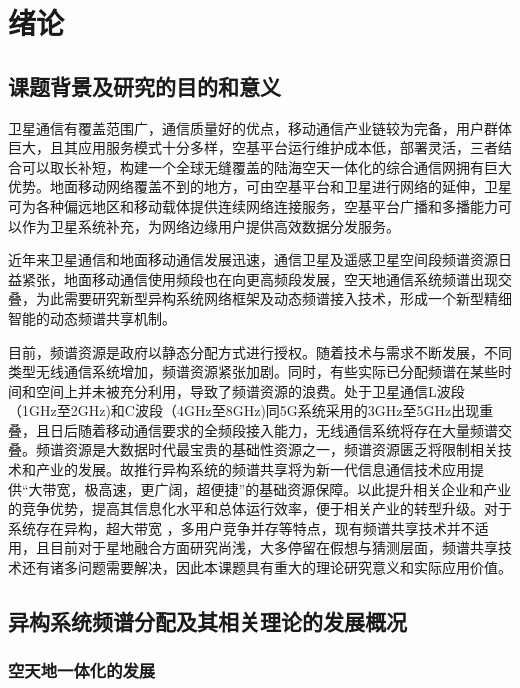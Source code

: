 \chapter{绪论}
\section{课题背景及研究的目的和意义}
卫星通信有覆盖范围广，通信质量好的优点，移动通信产业链较为完备，用户群体巨大，且其应用服务模式十分多样，空基平台运行维护成本低，部署灵活，三者结合可以取长补短，构建一个全球无缝覆盖的陆海空天一体化的综合通信网拥有巨大优势。地面移动网络覆盖不到的地方，可由空基平台和卫星进行网络的延伸，卫星可为各种偏远地区和移动载体提供连续网络连接服务，空基平台广播和多播能力可以作为卫星系统补充，为网络边缘用户提供高效数据分发服务。

近年来卫星通信和地面移动通信发展迅速，通信卫星及遥感卫星空间段频谱资源日益紧张，地面移动通信使用频段也在向更高频段发展，空天地通信系统频谱出现交叠，为此需要研究新型异构系统网络框架及动态频谱接入技术，形成一个新型精细智能的动态频谱共享机制。

目前，频谱资源是政府以静态分配方式进行授权。随着技术与需求不断发展，不同类型无线通信系统增加，频谱资源紧张加剧。同时，有些实际已分配频谱在某些时间和空间上并未被充分利用，导致了频谱资源的浪费。处于卫星通信L波段（1GHz至2GHz)和C波段（4GHz至8GHz)同5G系统采用的3GHz至5GHz出现重叠，且日后随着移动通信要求的全频段接入能力，无线通信系统将存在大量频谱交叠。频谱资源是大数据时代最宝贵的基础性资源之一，频谱资源匮乏将限制相关技术和产业的发展。故推行异构系统的频谱共享将为新一代信息通信技术应用提供“大带宽，极高速，更广阔，超便捷”的基础资源保障。以此提升相关企业和产业的竞争优势，提高其信息化水平和总体运行效率，便于相关产业的转型升级。对于系统存在异构，超大带宽 ，多用户竞争并存等特点，现有频谱共享技术并不适用，且目前对于星地融合方面研究尚浅，大多停留在假想与猜测层面，频谱共享技术还有诸多问题需要解决，因此本课题具有重大的理论研究意义和实际应用价值。

\section{异构系统频谱分配及其相关理论的发展概况}
\subsection{空天地一体化的发展}

